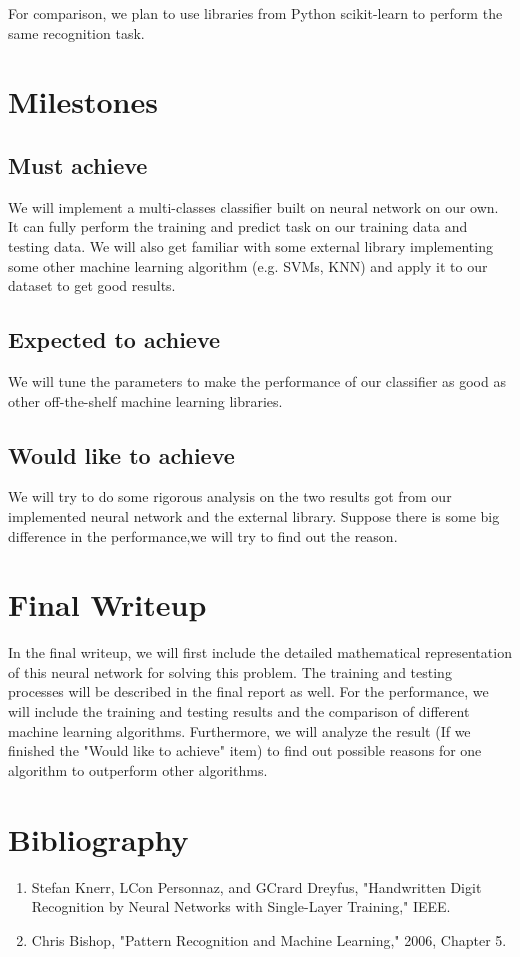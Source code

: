 \documentclass[11pt]{article}
\begin{document}
For comparison, we plan to use libraries from Python scikit-learn to perform the same recognition task.

\section{Milestones}
\subsection{Must achieve}
We will implement a multi-classes classifier built on neural network on our own. It can fully perform the training and predict task on our training data and testing data. We will also get familiar with some external library implementing some other machine learning algorithm (e.g. SVMs, KNN) and apply it to our dataset to get good results.

\subsection{Expected to achieve}
We will tune the parameters to make the performance of our classifier as good as other off-the-shelf machine learning libraries.

\subsection{Would like to achieve}
We will try to do some rigorous analysis on the two results got from our implemented neural network and the external library. Suppose there is some big difference in the performance,we will try to find out the reason.

\section{Final Writeup}
In the final writeup, we will first include the detailed mathematical representation of this neural network for solving this problem. The training and testing processes will be described in the final report as well. For the performance, we will include the training and testing results and the comparison of different machine learning algorithms. Furthermore, we will analyze the result (If we finished the "Would like to achieve" item) to find out possible reasons for one algorithm to outperform other algorithms.

\section{Bibliography}
\begin{enumerate}
\item Stefan Knerr, LCon Personnaz, and GCrard Dreyfus, "Handwritten Digit Recognition by Neural Networks with Single-Layer Training," IEEE.
\item Chris Bishop, "Pattern Recognition and Machine Learning," 2006, Chapter 5.
\end{enumerate}
\end{document}
